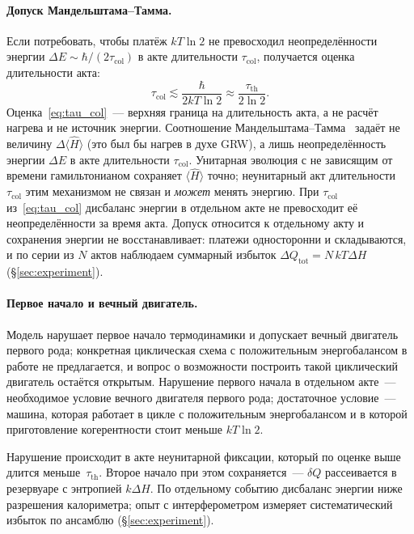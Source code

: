 \documentclass[11pt,a4paper]{article}
\newcommand{\Sref}[1]{\hyperref[#1]{\S\ref{#1}}}
\begin{document}
\paragraph{Допуск Мандельштама--Тамма.}
Если потребовать, чтобы платёж $kT\ln 2$ не превосходил неопределённости энергии $\Delta E\sim\hbar/(2\tau_{\mathrm{col}})$ в акте длительности $\tau_{\mathrm{col}}$, получается оценка длительности акта:
\begin{equation}
\tau_{\mathrm{col}} \lesssim \frac{\hbar}{2kT\ln 2} \approx \frac{\tau_{\mathrm{th}}}{2\ln 2}.
\label{eq:tau_col}
\end{equation}
Оценка~\eqref{eq:tau_col}~--- верхняя граница на длительность акта, а не расчёт нагрева и не источник энергии. Соотношение Мандельштама--Тамма~\cite{mandelstam1945} задаёт не величину $\Delta\langle\hat{H}\rangle$ (это был бы нагрев в духе GRW), а лишь неопределённость энергии $\Delta E$ в акте длительности $\tau_{\mathrm{col}}$. Унитарная эволюция с не зависящим от времени гамильтонианом сохраняет $\langle\hat{H}\rangle$ точно; неунитарный акт длительности $\tau_{\mathrm{col}}$ этим механизмом не связан и \emph{может} менять энергию. При $\tau_{\mathrm{col}}$ из~\eqref{eq:tau_col} дисбаланс энергии в отдельном акте не превосходит её неопределённости за время акта. Допуск относится к отдельному акту и сохранения энергии не восстанавливает: платежи односторонни и складываются, и по серии из $N$ актов наблюдаем суммарный избыток $\Delta Q_{\mathrm{tot}} = N\,kT\Delta H$ (\Sref{sec:experiment}).

\paragraph{Первое начало и вечный двигатель.}
Модель нарушает первое начало термодинамики и допускает вечный двигатель первого рода; конкретная циклическая схема с положительным энергобалансом в работе не предлагается, и вопрос о возможности построить такой циклический двигатель остаётся открытым. Нарушение первого начала в отдельном акте~--- необходимое условие вечного двигателя первого рода; достаточное условие~--- машина, которая работает в цикле с положительным энергобалансом и в которой приготовление когерентности стоит меньше $kT\ln 2$.

Нарушение происходит в акте неунитарной фиксации, который по оценке выше длится меньше~$\tau_{\mathrm{th}}$. Второе начало при этом сохраняется~--- $\delta Q$ рассеивается в резервуаре с энтропией $k\Delta H$. По отдельному событию дисбаланс энергии ниже разрешения калориметра; опыт с интерферометром измеряет систематический избыток по ансамблю (\Sref{sec:experiment}).
\end{document}
